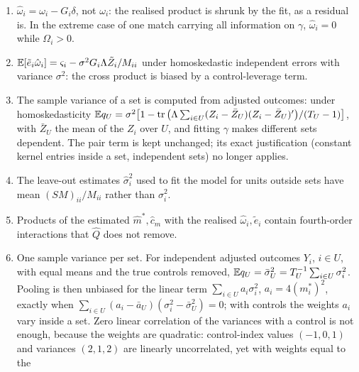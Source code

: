 \begin{enumerate}
$\hat Q_{\rm full}=\hat Q-2\tr(CS_dC\hat H)+\tr(C\hat HC\hat H)$, whose conditional mean is
$\tr\{C(S_d-\hat H)C(S_d-\hat H)\}$, while $\hat L=4\hat m'(S_d-\hat H)\hat m$ exactly. The middle term is the average
of $u'\hat Hu$ over the existing draws; the last needs $2k$ further applications of $C$, whereas the control term as implemented needs no
further solve. (Under the default  \fevc{} 0.6.0 adds an offset pass of two solves per
point-estimate probe, 400 by default, to form the fixed-offset units;  avoids it.) $S_d-\hat H$ need not be
positive semidefinite, so it cannot be drawn from.
\item $\hat\omega_i=\omega_i-G_i\delta$, not $\omega_i$: the realised product is shrunk by the fit, as a residual is.
In the extreme case of one match carrying all information on $\gamma$, $\hat\omega_i=0$ while $\Omega_i>0$.
\item $\mathbb{E}[\tilde e_i\hat\omega_i]=\varsigma_i-\sigma^2G_i\Lambda\tilde Z_i/M_{ii}$ under homoskedastic independent errors
with variance $\sigma^2$: the cross product is biased by a control-leverage term.
\item The sample variance of a set is computed from adjusted outcomes: under homoskedasticity
$\mathbb{E} q_U=\sigma^2\big[1-\operatorname{tr}\big(\Lambda\sum_{i\in U}(Z_i-\bar Z_U)(Z_i-\bar Z_U)'\big)/(T_U-1)\big]$, with $\bar Z_U$ the
mean of the $Z_i$ over $U$, and fitting $\gamma$ makes different sets dependent. The pair term is kept unchanged;
its exact justification (constant kernel entries inside a set, independent sets) no longer applies.
\item The leave-out estimates $\hat\sigma_i^2$ used to fit the model for units outside sets have mean
$(SM)_{ii}/M_{ii}$ rather than $\sigma_i^2$.
\item Products of the estimated $\hat m^*,\hat c_m$ with the realised $\hat\omega_i,\tilde e_i$ contain fourth-order
interactions that $\hat Q$ does not remove.
\item One sample variance per set. For independent adjusted outcomes $Y_i$, $i\in U$, with equal means and the
true controls removed, $\mathbb{E} q_U=\bar\sigma_U^2=T_U^{-1}\sum_{i\in U}\sigma_i^2$. Pooling is then unbiased for the
linear term $\sum_{i\in U}a_i\sigma_i^2$, $a_i=4(m_i^*)^2$, exactly when
$\sum_{i\in U}(a_i-\bar a_U)(\sigma_i^2-\bar\sigma_U^2)=0$; with controls the weights $a_i$ vary inside a set. Zero
linear correlation of the variances with a control is not enough, because the weights are quadratic:
control-index values $(-1,0,1)$ and variances $(2,1,2)$ are linearly uncorrelated, yet with weights equal to the

\end{enumerate}
